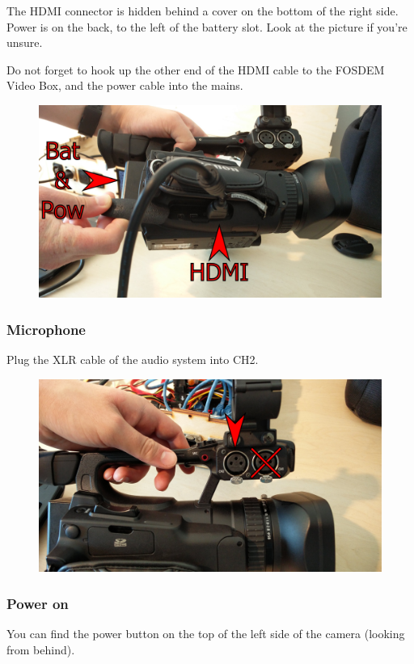 \documentclass{article}
\begin{document}
The HDMI connector is hidden behind a cover on the bottom of the right side.
Power is on the back, to the left of the battery slot.
Look at the picture if you're unsure.

Do not forget to hook up the other end of the HDMI cable to the FOSDEM Video Box, and the power cable into the mains.

\begin{figure}[H]
  \centering
\includegraphics[width = 120mm]{Canon01.jpg}
\end{figure}

\subsubsection{Microphone}
Plug the XLR cable of the audio system into CH2.

\begin{figure}[H]
  \centering
\includegraphics[width = 120mm]{Canon02.jpg}
\end{figure}

\subsubsection{Power on}
You can find the power button on the top of the left side of the camera (looking from behind).
\end{document}
